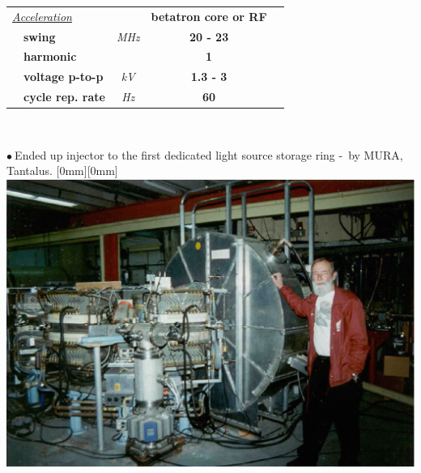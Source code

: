 \documentclass[12pt]{article}
\newcommand{\nib}{\noindent \ensuremath{\bullet~}}
\begin{document}
{\begin{minipage}[b]{.65\linewidth}
\begin{center}
\begin{tabular}{llccc}
\multicolumn{2}{l}{\it  \underline{Acceleration}}& \bf & \bf betatron core or RF                 &  \\
      & \bf  swing      & \it  MHz & \bf    20 - 23   & \bf   \\
      & \bf harmonic    & \it      & \bf           1       & \bf   \\
      & \bf voltage p-to-p& \it  kV& \bf    1.3 - 3        & \bf   \\
      & \bf cycle rep. rate& \it Hz& \bf        60       & \bf       
   \end{tabular}
  \end{center}

~~~~~~~~~

\end{minipage}


\nib Ended up  injector to the first dedicated light source storage ring -~by MURA, Tantalus.
\hspace{-.1\linewidth}\raisebox{2ex}[0mm][0mm]{\includegraphics*[width=.3\linewidth]{./figs_FFAG_introSlides/tantalus.eps} }

}


\clearpage 
\end{document}
